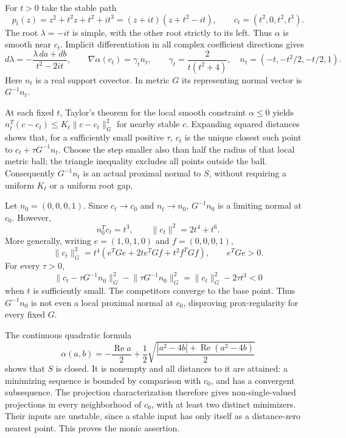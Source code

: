 \documentclass[11pt]{article}
\theoremstyle{remark}\newtheorem{remark}[theorem]{Remark}
\newcommand{\norm}[1]{\lVert #1\rVert}
\newcommand{\Rea}{\operatorname{Re}}
\begin{document}
For $t>0$ take the stable path
\begin{equation}\label{eq:path}
 p_t(z)=z^2+t^2z+t^2+it^3=(z+it)(z+t^2-it),
 \qquad c_t=(t^2,0,t^2,t^3).
\end{equation}
The root $\lambda=-it$ is simple, with the other root strictly to its left.
Thus $\alpha$ is smooth near $c_t$. Implicit differentiation in all complex
coefficient directions gives
\[
 d\lambda=-\frac{\lambda\,da+db}{t^2-2it},\qquad
 \nabla\alpha(c_t)=\gamma_t n_t,\qquad
 \gamma_t=\frac{2}{t(t^2+4)},\quad
 n_t=(-t,-t^2/2,-t/2,1).
\]
Here $n_t$ is a real support covector. In metric $G$ its representing normal
vector is $G^{-1}n_t$.

At each fixed $t$, Taylor's theorem for the local smooth constraint
$\alpha\leq0$ yields
$n_t^T(c-c_t)\leq K_t\norm{c-c_t}_G^2$ for nearby stable $c$.
Expanding squared distances shows that, for a sufficiently small positive
$\tau$, $c_t$ is the unique closest such point to $c_t+\tau G^{-1}n_t$.
Choose the step smaller also than half the radius of that local metric ball;
the triangle inequality excludes all points outside the ball. Consequently
$G^{-1}n_t$ is an actual proximal normal to $S$, without requiring a uniform
$K_t$ or a uniform root gap.

Let $n_0=(0,0,0,1)$. Since $c_t\to c_0$ and $n_t\to n_0$,
$G^{-1}n_0$ is a limiting normal at $c_0$. However,
\begin{equation}\label{eq:obstruction}
 n_0^Tc_t=t^3,\qquad
 \norm{c_t}^2=2t^4+t^6.
\end{equation}
More generally, writing $e=(1,0,1,0)$ and $f=(0,0,0,1)$,
\[
 \norm{c_t}_G^2=t^4(e^TGe+2t e^TGf+t^2f^TGf),\qquad e^TGe>0.
\]
For every $\tau>0$,
\[
 \norm{c_t-\tau G^{-1}n_0}_G^2
       -\norm{\tau G^{-1}n_0}_G^2
       =\norm{c_t}_G^2-2\tau t^3<0
\]
when $t$ is sufficiently small. The competitors converge to the base point.
Thus $G^{-1}n_0$ is not even a local proximal normal at $c_0$, disproving
prox-regularity for every fixed $G$.

The continuous quadratic formula
\begin{equation}\label{eq:alpha}
 \alpha(a,b)=-\frac{\Rea a}{2}
  +\frac12\sqrt{\frac{|a^2-4b|+\Rea(a^2-4b)}{2}}
\end{equation}
shows that $S$ is closed. It is nonempty and all distances to it are attained:
a minimizing sequence is bounded by comparison with $c_0$, and has a
convergent subsequence. The projection characterization therefore gives
non-single-valued projections in every neighborhood of $c_0$, with at least
two distinct minimizers. Their inputs are unstable, since a stable input has
only itself as a distance-zero nearest point. This proves the monic assertion.
\end{document}
